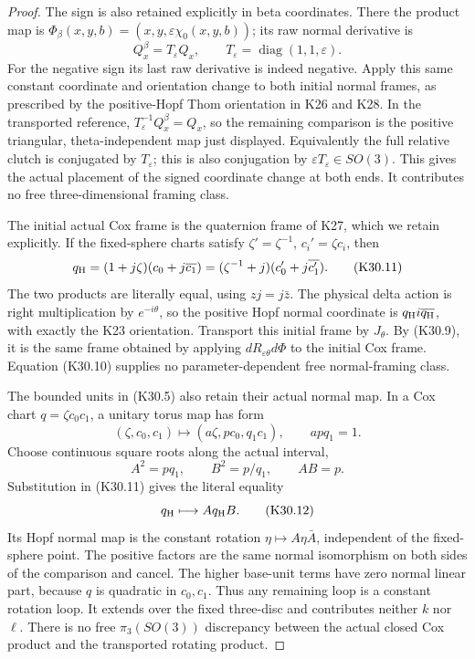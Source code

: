 \begin{proof}
The sign is also retained explicitly in beta coordinates.
There the product map is
\(\Phi_\beta(x,y,b)=(x,y,\varepsilon\chi_0(x,y,b))\);
its raw normal derivative is
\[
 Q_x^\beta=T_\varepsilon Q_x,\qquad
 T_\varepsilon=\operatorname{diag}(1,1,\varepsilon).
 \tag{K30.10a}
\]
For the negative sign its last raw derivative is indeed negative.
Apply this same constant coordinate and orientation change to
both initial normal frames, as prescribed by the positive-Hopf
Thom orientation in K26 and K28. In the transported reference,
\(T_\varepsilon^{-1}Q_x^\beta=Q_x\), so the remaining comparison
is the positive triangular, theta-independent map just displayed.
Equivalently the full relative clutch is conjugated by
\(T_\varepsilon\); this is also conjugation by
\(\varepsilon T_\varepsilon\in SO(3)\).
This gives the actual placement of the signed coordinate change
at both ends. It contributes no free three-dimensional
framing class.

The initial actual Cox frame is the quaternion frame of K27,
which we retain explicitly. If the fixed-sphere charts satisfy
\(\zeta'=\zeta^{-1}\), \(c_i'=\zeta c_i\), then
\[
 q_{\rm H}
  =(1+j\zeta)(c_0+j\overline{c_1})
  =(\zeta^{-1}+j)(c_0'+j\overline{c_1'}).
 \tag{K30.11}
\]
The two products are literally equal, using \(zj=j\bar z\).
The physical delta action is right multiplication by
\(e^{-i\theta}\), so the positive Hopf normal coordinate is
\(q_{\rm H}i\overline{q_{\rm H}}\), with exactly the K23
orientation. Transport this initial frame by \(J_\theta\).
By (K30.9), it is the same frame obtained by applying
\(dR_{\varepsilon\theta}d\Phi\) to the initial Cox frame.
Equation (K30.10) supplies no parameter-dependent free
normal-framing class.

The bounded units in (K30.5) also retain their actual normal
map. In a Cox chart \(q=\zeta c_0c_1\), a unitary torus map
has form
\[
 (\zeta,c_0,c_1)\longmapsto
       (a\zeta,p c_0,q_1c_1),\qquad apq_1=1.
\]
Choose continuous square roots along the actual interval,
\[
             A^2=pq_1,\qquad B^2=p/q_1,\qquad AB=p.
\]
Substitution in (K30.11) gives the literal equality
\[
                         q_{\rm H}\longmapsto A q_{\rm H}B .
 \tag{K30.12}
\]
Its Hopf normal map is the constant rotation
\(\eta\mapsto A\eta\bar A\), independent of the fixed-sphere
point. The positive factors are the same normal isomorphism
on both sides of the comparison and cancel. The higher
base-unit terms have zero normal linear part, because \(q\)
is quadratic in \(c_0,c_1\). Thus any remaining loop is a
constant rotation loop. It extends over the fixed three-disc
and contributes neither \(k\) nor \(\ell\). There is no
free \(\pi_3(SO(3))\) discrepancy between the actual closed
Cox product and the transported rotating product.


\end{proof}
